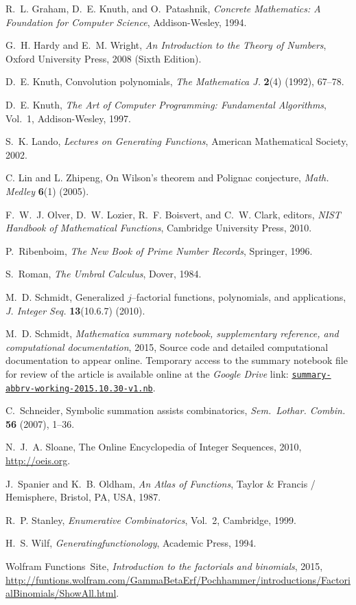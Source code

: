 \documentclass[12pt,reqno]{article}
\numberwithin{sfootnote}{section}
\numberwithin{equation}{section}
\theoremstyle{plain}
\theoremstyle{definition}
\theoremstyle{remark}
\newcommand{\TheSummaryNBFileGoogleDriveLink}[0]{https://drive.google.com/file/d/0B6na6iIT7ICZRFltbTVVcmVpVk0/view?usp=drivesdk}
\begin{document}
\begin{thebibliography}{10}
R.~L. Graham, D.~E. Knuth, and O.~Patashnik, {\em Concrete Mathematics: A
  Foundation for Computer Science}, Addison-Wesley, 1994.

G.~H. Hardy and E.~M. Wright, {\em An Introduction to the Theory of
  Numbers}, Oxford University Press, 2008 (Sixth Edition).

D.~E. Knuth, Convolution polynomials, {\em The Mathematica J.} {\bf 2}(4)
  (1992), 67--78.

D.~E. Knuth, {\em The Art of Computer Programming: Fundamental Algorithms},
  Vol.~1, Addison-Wesley, 1997.

S.~K. Lando, {\em Lectures on Generating Functions}, American Mathematical
  Society, 2002.

C. Lin and L. Zhipeng, On {W}ilson's theorem and {P}olignac conjecture, {\em
  Math. Medley} {\bf 6}(1) (2005).

F.~W.~J. Olver, D.~W. Lozier, R.~F. Boisvert, and C.~W. Clark,
  editors, {\em {NIST} Handbook of Mathematical Functions}, Cambridge
  University Press, 2010.

P.~Ribenboim, {\em The New Book of Prime Number Records}, Springer, 1996.

S.~Roman, {\em The Umbral Calculus}, Dover, 1984.

M.~D. Schmidt, Generalized $j$--factorial functions, polynomials, and
  applications, {\em J. Integer Seq.} {\bf 13}(10.6.7) (2010).

M.~D. Schmidt, {\em Mathematica summary notebook, 
supplementary reference, and computational documentation}, 2015, 
Source code and detailed computational documentation to appear online. 
Temporary access to the summary notebook file for review of the article 
is available online at the {\em Google Drive} link: 
\href{\TheSummaryNBFileGoogleDriveLink}{\texttt{summary-abbrv-working-2015.10.30-v1.nb}}. 

C.~Schneider, Symbolic summation assists combinatorics, {\em Sem.~Lothar.
  Combin.} {\bf 56} (2007), 1--36.

N.~J.~A. Sloane, The {O}nline {E}ncyclopedia of {I}nteger {S}equences, 2010, 
\url{http://oeis.org}. 

J.~Spanier and K.~B. Oldham, {\em An Atlas of Functions}, Taylor \&
  Francis / Hemisphere, Bristol, PA, USA, 1987.

R.~P. Stanley, {\em Enumerative Combinatorics}, Vol.~2, Cambridge, 1999.

H.~S. Wilf, {\em Generatingfunctionology}, Academic Press, 1994.

{W}olfram Functions~Site, 
{\em Introduction to the factorials and binomials}, 2015, 
\url{http://funtions.wolfram.com/GammaBetaErf/Pochhammer/introductions/FactorialBinomials/ShowAll.html}.

\end{thebibliography}
\end{document}
